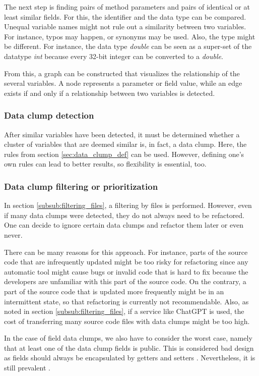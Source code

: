 The next step is finding pairs of method parameters and pairs of identical or at least similar fields. For this, the identifier and the data type can be compared. Unequal variable names might not rule out a similarity between two variables. For instance, typos may happen, or synonyms may be used. Also, the type might be different. For instance, the data type \textit{double} can be seen as a super-set of the datatype \textit{int} because every 32-bit integer can be converted to a \textit{double}.

From this, a graph can be constructed that visualizes the relationship of the several variables. A node represents a parameter or field value, while an edge exists if and only if a relationship between two variables is detected. 

\subsubsection{Data clump detection}
After similar variables have been detected, it must be determined whether a cluster of variables that are deemed similar is, in fact, a data clump. Here, the rules from section \ref{sec:data_clump_def} can be used. However, defining one's own rules can lead to better results, so flexibility is essential, too. 

\subsubsection{Data clump filtering or prioritization} \label{subsub:filtering_data_clumps}
In section \ref{subsub:filtering_files}, a filtering by files is performed. However, even if many data clumps were detected, they do not always need to be refactored. One can decide to ignore certain data clumps and refactor them later or even never. 

There can be many reasons for this approach. For instance, parts of the source code that are infrequently updated might be too risky for refactoring since any automatic tool might cause bugs or invalid code that is hard to fix because the developers are unfamiliar with this part of the source code. On the contrary, a part of the source code that is updated more frequently might be in an intermittent state, so that refactoring is currently not recommendable. Also, as noted in section  \ref{subsub:filtering_files}, if a service like ChatGPT is used, the cost of transferring many source code files with data clumps might be too high. 

In the case of field data clumps, we also have to consider the worst case, namely that at least one of the data clump fields is public. This is considered bad design as fields should always be encapsulated by getters and setters \cite{5680918}. Nevertheless, it is still prevalent \cite{5076631}.

